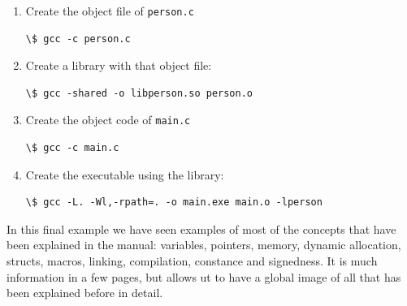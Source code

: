 \documentclass[a4paper]{article}
\begin{document}
\noindent
\begin{minipage}[H]{\linewidth}
\begin{enumerate}
\item Create the object file of \verb!person.c!

\noindent
\begin{minipage}[H]{\linewidth}
\mbox{}
\begin{lstlisting}[style=terminalStyle]
\$ gcc -c person.c
\end{lstlisting}
\end{minipage}
\item Create a library with that object file:

\noindent
\begin{minipage}[H]{\linewidth}
\mbox{}
\begin{lstlisting}[style=terminalStyle]
\$ gcc -shared -o libperson.so person.o
\end{lstlisting}
\end{minipage}
\item Create the object code of \verb!main.c!

\noindent
\begin{minipage}[H]{\linewidth}
\mbox{}
\begin{lstlisting}[style=terminalStyle]
\$ gcc -c main.c
\end{lstlisting}
\end{minipage}
\item Create the executable using the library:

\noindent
\begin{minipage}[H]{\linewidth}
\mbox{}
\begin{lstlisting}[style=terminalStyle]
\$ gcc -L. -Wl,-rpath=. -o main.exe main.o -lperson
\end{lstlisting}
\end{minipage}
\end{enumerate}
\end{minipage}

In this final example we have seen examples of most of the concepts that have
been explained in the manual: variables, pointers, memory, dynamic allocation,
structs, macros, linking, compilation, constance and signedness. It is much
information in a few pages, but allows ut to have a global image of all that
has been explained before in detail.
\end{document}
